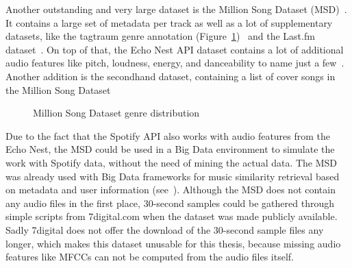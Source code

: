 Another outstanding and very large dataset is the Million Song Dataset (MSD)~\cite{msd1}. 
It contains a large set of metadata per track as well as a lot of supplementary datasets, like the tagtraum genre annotation (Figure~\ref{msddist})~\cite{msd5} and the Last.fm dataset~\cite{msd2}. On top of that, the Echo Nest API dataset contains a lot of additional audio features like pitch, loudness, energy, and danceability to name just a few~\cite{msd3}. 
Another addition is the secondhand dataset, containing a list of cover songs in the Million Song Dataset\cite{msd6}
\begin{figure}[thpb]
	\centering
	\caption{Million Song Dataset genre distribution~\cite[p. 6]{msd5}}
	\label{msddist}
\end{figure}
\FloatBarrier
\noindent Due to the fact that the Spotify API\cite{spotifyapi1} also works with audio features from the Echo Nest\cite{echonest1}, the MSD could be used in a Big Data environment to simulate the work with Spotify data, without the need of mining the actual data. The MSD was already used with Big Data frameworks for music similarity retrieval based on metadata and user information (see~\cite{msd4}). Although the MSD does not contain any audio files in the first place, 30-second samples could be gathered through simple scripts from 7digital.com when the dataset was made publicly available. Sadly 7digital does not offer the download of the 30-second sample files any longer, which makes this dataset unusable for this thesis, because missing audio features like MFCCs can not be computed from the audio files itself. 

